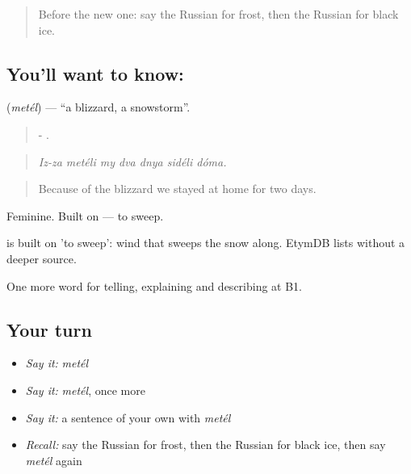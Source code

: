 \label{lesson:RU-C467-metel}



\begin{quote}
Before the new one: say the Russian for frost, then the Russian for black ice.
\end{quote}

\subsection*{You'll want to know: }
\textbf{} (\emph{metél}) — \textquotedblleft{}a blizzard, a snowstorm\textquotedblright{}.

\begin{quote}
-      .
\end{quote}

\begin{quote}
\emph{Iz-za metéli my dva dnya sidéli dóma.}
\end{quote}

\begin{quote}
Because of the blizzard we stayed at home for two days.
\end{quote}

Feminine. Built on \emph{} — to sweep.

\begin{cousinweb}
\emph{} is built on \emph{} 'to sweep': wind that sweeps the snow along. EtymDB lists \emph{} without a deeper source.
\end{cousinweb}

\begin{grammarlens}[title={What you've built}]
One more word for telling, explaining and describing at B1.
\end{grammarlens}

\subsection*{Your turn}
\begin{itemize}
\raggedright
  \item \emph{Say it:} \emph{metél}
  \item \emph{Say it:} \emph{metél}, once more
  \item \emph{Say it:} a sentence of your own with \emph{metél}
  \item \emph{Recall:} say the Russian for frost, then the Russian for black ice, then say \emph{metél} again
\end{itemize}

